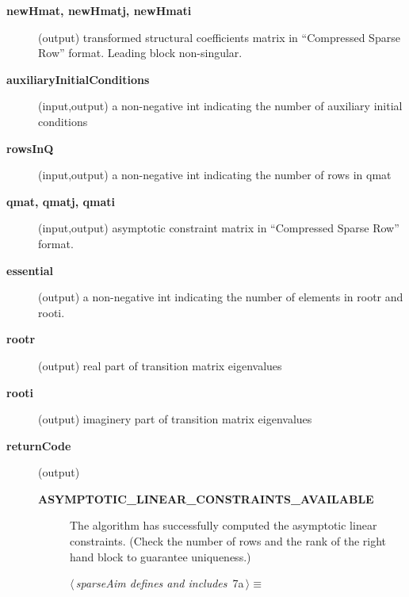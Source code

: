\documentclass{article}
\begin{document}
\begin{description}
\item[{\bf newHmat, newHmatj, newHmati}] (output) transformed 
structural coefficients matrix in ``Compressed Sparse Row'' format. Leading
block non-singular.
\item[{\bf auxiliaryInitialConditions}] (input,output) a non-negative int
 indicating the number of auxiliary initial conditions
\item[{\bf rowsInQ}] (input,output)  a non-negative int
 indicating the number of rows in qmat
\item[{\bf qmat, qmatj, qmati}] (input,output) asymptotic constraint matrix in ``Compressed Sparse Row'' format.
\item[{\bf essential}](output)  a non-negative int
 indicating the number of elements 
in rootr and rooti.
\item[{\bf rootr}] (output) real part of transition matrix eigenvalues
\item[{\bf rooti}] (output) imaginery part of transition matrix eigenvalues
\item[{\bf returnCode}] (output)  
\begin{description}
\item[{\bf ASYMPTOTIC\_LINEAR\_CONSTRAINTS\_AVAILABLE}]  The algorithm has successfully computed the asymptotic linear constraints. (Check the number of
rows and the rank of the right hand block to guarantee uniqueness.)
\begin{flushleft} \small
\begin{minipage}{\linewidth}\label{scrap2}\raggedright\small
{} $\langle\,${\itshape sparseAim defines and includes}\nobreak\ {\footnotesize {7a}}$\,\rangle\equiv$
\vspace{-1ex}
\vspace{-1.5ex}
\footnotesize
{}
\end{minipage}
\end{flushleft}
\end{description}
\end{description}
\end{document}
